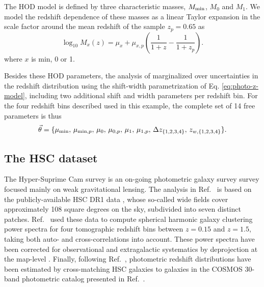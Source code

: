 \documentclass[a4paper,11pt]{article}
\begin{document}
      The HOD model is defined by three characteristic masses, $M_{\rm min}$, $M_0$ and $M_1$. We model the redshift dependence of these masses as a linear Taylor expansion in the scale factor around the mean redshift of the sample $z_p=0.65$ as
      \begin{equation}
        \log_{10}{M_x(z)} = \mu_x + \mu_{x, p} \left(\frac{1}{1+z} - \frac{1}{1+z_{p}}\right).
      \end{equation}
      where $x$ is $\mathrm{min}$, 0 or 1.
    
      Besides these HOD parameters, the analysis of \cite{1912.08209} marginalized over uncertainties in the redshift distribution using the shift-width parametrization of Eq. \ref{eq:photo-z-model}, including two additional shift and width parameters per redshift bin. For the four redshift bins described used in this example, the complete set of 14 free parameters is thus
      \begin{equation}
        \vec{\theta}=\{\mu_{\rm min},\,\mu_{{\rm min},p},\,\mu_0,\,\mu_{0,p},\,\mu_1,\,\mu_{1,p},\,\Delta z_{\{1,2,3,4\}},\,z_{w,\{1,2,3,4\}}\}.
      \end{equation}

    \subsection{The HSC dataset}\label{ssec:hsc.data}
      The Hyper-Suprime Cam survey is an on-going photometric galaxy survey survey focused mainly on weak gravitational lensing. The analysis in Ref.~\cite{1912.08209} is based on the publicly-available HSC DR1 data \cite{2018PASJ...70S...8A}, whose so-called wide fields cover approximately 108 square degrees on the sky, subdivided into seven distinct patches. Ref.~\cite{1912.08209} used these data to compute spherical harmonic galaxy clustering power spectra for four tomographic redshift bins between $z=0.15$ and $z=1.5$, taking both auto- and cross-correlations into account. These power spectra have been corrected for observational and extragalactic systematics by deprojection at the map-level \cite{2019MNRAS.484.4127A}. Finally, following Ref.~\cite{2019PASJ...71...43H}, photometric redshift distributions have been estimated by cross-matching HSC galaxies to galaxies in the COSMOS 30-band photometric catalog presented in Ref.~\cite{2016ApJS..224...24L}.
\end{document}
